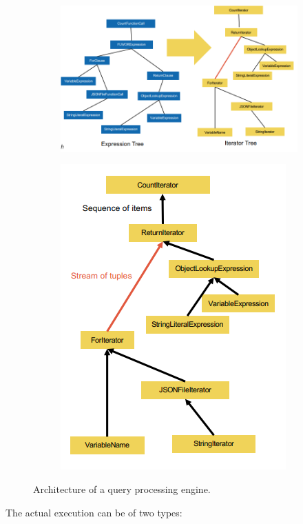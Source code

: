 \documentclass[11pt,oneside,a4paper]{article}
\begin{document}
{\begin{figure}[t!]
\begin{subfigure}[t]{.3\textwidth}
	\end{subfigure}
	\begin{subfigure}[t]{.3\textwidth}
		\centering
		\includegraphics[width=0.9\linewidth]{figures/querytrees_processing_4}
	\end{subfigure}
	\begin{subfigure}[t]{.3\textwidth}
		\centering
		\includegraphics[width=0.4\linewidth]{figures/querytrees_processing_5}
	\end{subfigure}
	\caption{Architecture of a query processing engine.}
	\vspace*{-6mm}
\end{figure}

\newpage

The actual execution can be of two types:

}
\end{document}
